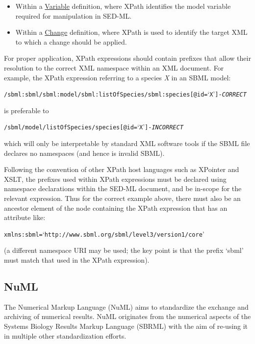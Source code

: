 \begin{itemize}
	\item {Within a \hyperref[class:variable]{Variable} definition, where XPath identifies the model variable required for manipulation in SED-ML.}
	\item {Within a \hyperref[class:change]{Change} definition, where XPath is used to identify the target XML to which a change should be applied.} 
\end{itemize}

For proper application, XPath expressions should contain prefixes that allow their resolution to the correct XML namespace within an XML document. For example, the XPath expression referring to a species \emph{X} in an SBML model:
\begin{alltt}
/sbml:sbml/sbml:model/sbml:listOfSpecies/sbml:species[@id=`X'] {\tickYes -\emph{CORRECT}}
\end{alltt}
is preferable to 
\begin{alltt}
/sbml/model/listOfSpecies/species[@id=`X'] {\tickNo -\emph{INCORRECT} }
\end{alltt}

which will only be interpretable by standard XML software tools if the SBML file declares no namespaces (and hence is invalid SBML).

Following the convention of other XPath host languages such as XPointer and XSLT, the prefixes used within XPath expressions must be declared using namespace declarations within the SED-ML document, and be in-scope for the relevant expression.
Thus for the correct example above, there must also be an ancestor element of the node containing the XPath expression that has an attribute like:
\begin{alltt}
xmlns:sbml=`http://www.sbml.org/sbml/level3/version1/core'
\end{alltt}
(a different namespace URI may be used; the key point is that the prefix `sbml' must match that used in the XPath expression).


\subsection{NuML}
\label{sec:numl}
The Numerical Markup Language (NuML) aims to standardize the exchange and archiving of numerical results. NuML originates from the numerical aspects of the Systems Biology Results Markup Language (SBRML) with the aim of re-using it in multiple other standardization efforts.

